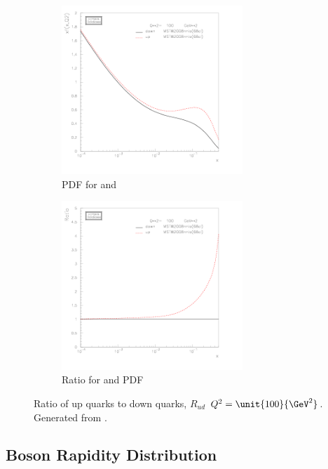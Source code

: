 \begin{figure}[htbp]
  \centering
  \begin{subfigure}{\textwidth}
    \centering
    \includegraphics[width=0.75\textwidth]{plot_pdf}
    \caption{PDF for \Pup and \Pdown}
    \label{fig:plot_pdf}
  \end{subfigure}
  \begin{subfigure}{\textwidth}
    \centering
    \includegraphics[width=0.75\textwidth]{plot_pdf_ratio}
    \caption{Ratio for \Pup and \Pdown PDF}
    \label{fig:plot_pdf_ratio}
  \end{subfigure}
  \caption{Ratio of up quarks to down quarks, $R_{ud}$ $ Q^2=\unit{100}{\GeV^2}$.
           Generated from \cite{}.}
  \label{fig:w_process} 
\end{figure}

\subsection{\PW Boson Rapidity Distribution}
\label{wbos:wrapsec}

